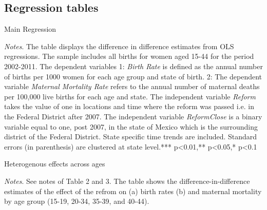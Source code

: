 \documentclass[a4paper, 11pt]{article}
\begin{document}
\begin{spacing}{1.5}


\section{Regression tables}
\begin{table}[htpb!]\caption{Main Regression}\label{reg1}
\begin{threeparttable}
	  
	\begin{tablenotes}
		\footnotesize
		\item \textit{Notes}.  The table displays the difference in difference estimates from OLS regressions. The sample includes all births for women aged 15-44 for the period 2002-2011. The dependent variables 1: \textit{Birth Rate} is defined as the annual number of births per 1000 women for each age group and state of birth. 2: The dependent variable \textit{Maternal Mortality Rate} refers to the annual number of maternal deaths per 100,000 live births for each age and state. The independent variable \textit{Reform} takes the value of one in locations and time where the reform was passed i.e. in the Federal District after 2007. The independent variable \textit{ReformClose} is a binary variable equal to one, post 2007, in the state of Mexico which is the surrounding district of the Federal District. State specific time trends are included. Standard errors (in parenthesis) are clustered at state level.*** p<0.01,** p<0.05,* p<0.1
	\end{tablenotes} 
\end{threeparttable}
\end{table}
 
 
 
\begin{table}[htpb!]\caption{Heterogenous effects across ages} \label{heteromed}
	\begin{threeparttable}
		
		{\small  }
		\begin{tablenotes}
			\footnotesize
			\item \textit{Notes}.  See notes of Table 2 and 3. The table shows the difference-in-difference estimates of the effect of the refrom on (a) birth rates (b) and maternal mortality by age group (15-19, 20-34, 35-39, and 40-44).
		\end{tablenotes} 
	\end{threeparttable}
\end{table}


 	
 	 

 


\end{spacing}
\end{document}
